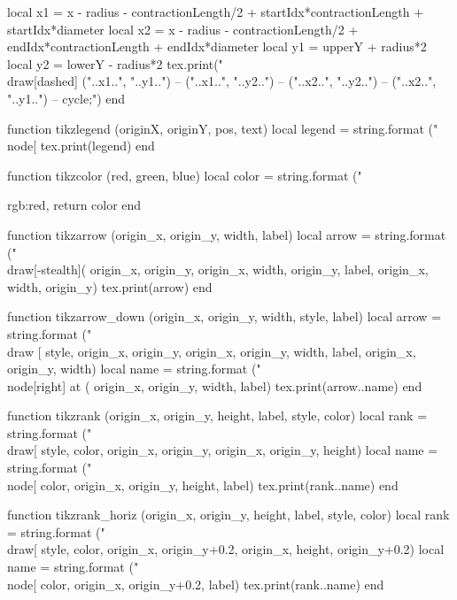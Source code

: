 \begin{luacode*}
	 local x1 = x - radius - contractionLength/2 + startIdx*contractionLength + startIdx*diameter
	 local x2 = x - radius - contractionLength/2 + endIdx*contractionLength + endIdx*diameter
	 local y1 = upperY + radius*2
	 local y2 = lowerY - radius*2
	 tex.print("\\draw[dashed] ("..x1..", "..y1..") -- ("..x1..", "..y2..") -- ("..x2..", "..y2..") -- ("..x2..", "..y1..") -- cycle;")
end

function tikzlegend (originX, originY, pos, text)
	 local legend = string.format ("\\node[%
	 tex.print(legend)
end

function tikzcolor (red, green, blue)
	 local color = string.format ("{rgb:red,%
	 return color
end

function tikzarrow (origin_x, origin_y, width, label)
	 local arrow = string.format ("\\draw[-stealth](%
																origin_x, origin_y, origin_x, width, origin_y, label, origin_x, width, origin_y)
	 tex.print(arrow)
end

function tikzarrow_down (origin_x, origin_y, width, style, label)
	 local arrow = string.format ("\\draw [%
																style, origin_x, origin_y, origin_x, origin_y, width, label, origin_x, origin_y, width)
	 local name = string.format ("\\node[right] at (%
															 origin_x, origin_y, width, label)
	 tex.print(arrow..name)
end

function tikzrank (origin_x, origin_y, height, label, style, color)
	 local rank = string.format ("\\draw[%
															 style, color, origin_x, origin_y, origin_x, origin_y, height)
	 local name = string.format ("\\node[%
															 color, origin_x, origin_y, height, label)
	 tex.print(rank..name)
end

function tikzrank_horiz (origin_x, origin_y, height, label, style, color)
	 local rank = string.format ("\\draw[%
															 style, color, origin_x, origin_y+0.2, origin_x, height, origin_y+0.2)
	 local name = string.format ("\\node[%
															 color, origin_x, origin_y+0.2, label)
	 tex.print(rank..name)
end

}
\end{luacode*}
